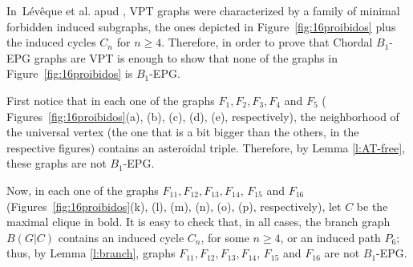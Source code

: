 \documentclass[9pt]{entcs}
\begin{document}
In~L{\'e}v{\^e}que et al. \cite{leveque2009characterizing} apud \cite{alcon2015characterizing},  VPT graphs were characterized by a family of minimal forbidden induced subgraphs,
the ones depicted in 
Figure~\ref{fig:16proibidos} plus the induced cycles $C_n$ for $n\geq 4$. Therefore, in order to prove
that Chordal $B_1$-EPG graphs are VPT is enough to show that none of the graphs in Figure~\ref{fig:16proibidos} 
is $B_1$-EPG. %

First notice that in each one of the graphs $F_{1}, F_{2}, F_{3}, F_{4}$ and $F_{5}$ ( Figures~\ref{fig:16proibidos}(a), (b), (c), (d), (e), respectively), the neighborhood of the universal vertex (the one that is a bit bigger than the others, in the respective figures) contains an asteroidal triple. Therefore, by Lemma \ref{l:AT-free}, these graphs are not  $B_1$-EPG.

Now, in each one of the graphs $F_{11}, F_{12}, F_{13}, F_{14}$, $F_{15}$ and $F_{16}$  (Figures~\ref{fig:16proibidos}(k), (l), (m), (n), (o), (p), respectively), let $C$ be the maximal clique in bold. It is easy to check that, in all cases, the branch graph $B(G|C)$ contains an induced cycle $C_n$, for some $n\geq 4$, or an induced path $P_6$; thus, by Lemma \ref{l:branch},  graphs $F_{11}, F_{12}, F_{13}, F_{14}$, $F_{15}$ and $F_{16}$ are not $B_1$-EPG.




\end{document}
